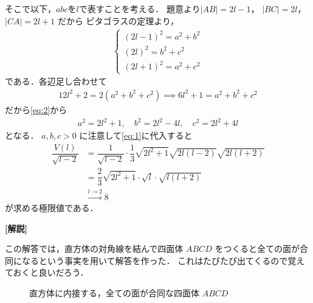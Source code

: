 \documentclass[../../main.tex]{subfiles}
\begin{document}
そこで以下，$abc$を$l$で表すことを考える．
題意より$|AB| = 2l-1$， $|BC| = 2l$， $|CA| = 2l+1$ だから
ピタゴラスの定理より，
\begin{align}
  \begin{cases}
    (2l-1)^2 = a^2+b^2 \\
    (2l)^2 = b^2+c^2   \\
    (2l+1)^2 = a^2+c^2
  \end{cases} \label{eq:2}
\end{align}
である．各辺足し合わせて
\begin{align}
  12l^2+2 = 2(a^2+b^2+c^2) \implies 6l^2+1 = a^2+b^2+c^2
\end{align}
だから\cref{eq:2}から
\begin{align}
  a^2 = 2l^2+1, \quad b^2 = 2l^2-4l, \quad c^2 = 2l^2+4l \label{eq:3}
\end{align}
となる．
$a,b,c > 0$ に注意して\cref{eq:1}に代入すると
\begin{align}
  \dfrac{V(l)}{\sqrt{l-2}}
  &= \dfrac{1}{\sqrt{l-2}} \cdot \dfrac{1}{3} \sqrt{2l^2+1} \sqrt{2l(l-2)} \sqrt{2l(l+2)} \\
  &= \dfrac{2}{3} \sqrt{2l^2+1} \cdot \sqrt{l} \cdot \sqrt{l(l+2)} \\
  &\xrightarrow{l \to 2} 8
\end{align}
が求める極限値である．

{\bf [解説]}

この解答では，直方体の対角線を結んで四面体 $ABCD$ をつくると全ての面が合同になるという事実を用いて解答を作った．
これはたびたび出てくるので覚えておくと良いだろう．

\begin{figure}[htb]
  \centering
  \caption{直方体に内接する，全ての面が合同な四面体 $ABCD$}
\end{figure}
\end{document}
